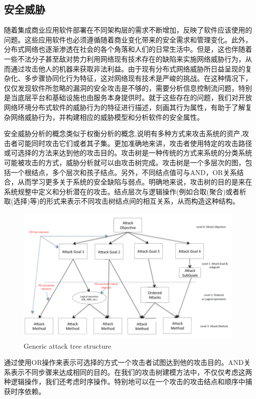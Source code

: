 \subsection{安全威胁}
\par
随着集成商业应用软件部署在不同架构层的需求不断增加，反映了软件应该使用的问题。这些应用软件也必须遵循随着商业变化带来的安全需求和管理变化。此外，分布式网络也逐渐渗透在社会的各个角落和人们的日常生活中。但是，这也伴随着一些不法分子甚至敌对势力利用网络现有技术存在的缺陷来实施网络威胁行为，从而通过攻击他人的机器来获取非法利益。由于现有分布式网络威胁所日益呈现的复杂化、多步骤协同化行为特征，这对网络现有技术是严峻的挑战。在这种情况下，仅仅发现软件所忽略的漏洞的安全攻击是不够的，需要分析信息控制流问题，特别是当底层平台和基础设施也由服务本身提供时。就于这些存在的问题，我们对开放网络环境分布式软件的威胁行为的特征进行描述，刻画其行为属性，有助于了解复杂网络威胁行为，并构建相应的威胁模型和分析软件的安全属性。
\par
安全威胁分析的概念类似于权衡分析的概念,说明有多种方式来攻击系统的资产,攻击者可能同时攻击它们或者其子集。更加准确地来讲，攻击者使用特定的攻击路径或可选择的方法来达到他的攻击目的。攻击树是一种传统的方式来系统的分类系统可能被攻击的方式，威胁分析就可以由攻击树完成。攻击树是一个多层次的图，包括一个根结点，多个层次和孩子结点。另外，不同结点值可与AND，OR关系结合，从而学习更多关于系统的安全缺陷与弱点。明确地来说，攻击树的目的是来在系统规整中定义和分析潜在的攻击。结点层次与逻辑操作(例如合取(聚合)或者析取(选择)等)的形式来表示不同攻击树结点间的相互关系，从而构造这种结构。
\par
\begin{figure}[h]
	\centering
	\includegraphics[width=12cm,height=6.75cm]{imgs/attacktree.png}
	\caption{Generic attack tree structure}
	\label{attacktree}
\end{figure}
\par
通过使用OR操作来表示可选择的方式一个攻击者试图达到他的攻击目的。AND关系表示不同步骤来达成相同的目的。在我们的攻击树建模方法中，不仅仅考虑这两种逻辑操作，我们还考虑时序操作。特别地可以在一个攻击的攻击结点和顺序中捕获时序依赖。
